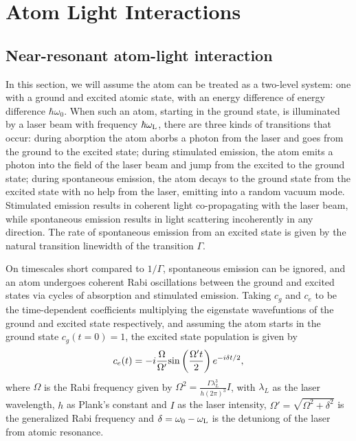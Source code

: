 \renewcommand{\thechapter}{2}

\chapter{Atom Light Interactions}

\section{Near-resonant atom-light interaction}\label{chap:2sec:atomLight}

In this section, we will assume the atom can be treated as a two-level system: one with a ground and excited atomic state, with an energy difference of energy difference $\hbar\omega_0$. When such an atom, starting in the ground state, is illuminated by a laser beam with frequency $\hbar\omega_{\rm{L}}$, there are three kinds of transitions that occur: during aborption the atom aborbs a photon from the laser and goes from the ground to the excited state; during stimulated emission, the atom emits a photon into the field of the laser beam and jump from the excited to the ground state; during spontaneous emission, the atom decays to the ground state from the excited state with no help from the laser, emitting into a random vacuum mode. Stimulated emission results in coherent light co-propagating with the laser beam, while spontaneous emission results in light scattering incoherently in any direction. The rate of spontaneous emission from an excited state is given by the natural transition linewidth of the transition $\Gamma$. 

On timescales short compared to $1/\Gamma$, spontaneous emission can be ignored, and an atom undergoes coherent Rabi oscillations between the ground and excited states via cycles of absorption and stimulated emission\cite{LCT}. Taking $c_g$ and $c_e$ to be the time-dependent coefficients multiplying the eigenstate wavefuntions of the ground and excited state respectively, and assuming the atom starts in the ground state $c_g(t=0)=1$, the excited state population is given by
\begin{equation}
c_e(t)=-i\frac{\Omega}{\Omega'}{\rm sin}\left(\frac{\Omega't}{2}\right)e^{-i\delta t/2},
\end{equation}
where $\Omega$ is the Rabi frequency given by $\Omega^2 = \frac{\Gamma\lambda_L^3}{h(2\pi)^3}I$, with $\lambda_L$ as the laser wavelength, $h$ as Plank's constant and $I$ as the laser intensity,  $\Omega'=\sqrt{\Omega^2+\delta^2}$ is the generalized Rabi frequency and $\delta=\omega_0-\omega_{\rm{L}}$ is the detuniong of the laser from atomic resonance. 

